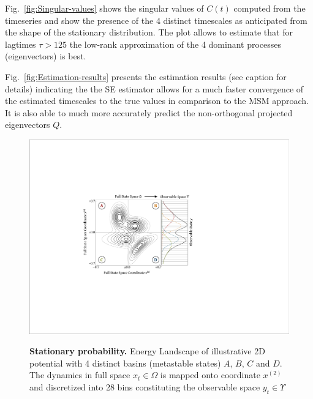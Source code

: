 \documentclass[aps,pre,twocolumn,nofootinbib,superscriptaddress,linenumbers]{revtex4-1}
\begin{document}
Fig.~\ref{fig:Singular-values} shows the singular values of $C(t)$
computed from the timeseries and show the presence of the 4 distinct
timescales as anticipated from the shape of the stationary distribution.
The plot allows to estimate that for lagtimes $\tau>125$ the low-rank
approximation of the 4 dominant processes (eigenvectors) is best.

Fig.~\ref{fig:Estimation-results} presents the estimation results
(see caption for details) indicating the the SE estimator allows for
a much faster convergence of the estimated timescales to the true
values in comparison to the MSM approach. It is also able to much
more accurately predict the non-orthogonal projected eigenvectors
$Q$. 

\begin{figure}
\includegraphics[width=1\columnwidth]{figures/EnergyLandscape}

\label{fig:Energy-Landscape}\textbf{Stationary probability.} Energy
Landscape of illustrative 2D potential\textbf{ }with 4 distinct basins
(metastable states) $A$, $B$, $C$ and $D$. The dynamics in full
space $x_{t}\in\Omega$ is mapped onto coordinate $x^{(2)}$ and discretized
into 28 bins constituting the observable space $y_{t}\in\Upsilon$ 
\end{figure}
\end{document}
